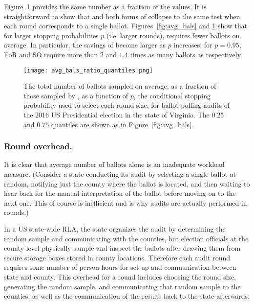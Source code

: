 Figure~\ref{fig:avg_bals_ratio} provides the same number as a fraction of the \Providence values.
It is straightforward to show that \Providence and both forms of \BRAVO collapse to the same test when each round corresponds to a single ballot. Figures~\ref{fig:avg_bals} and \ref{fig:avg_bals_ratio} show that for larger stopping probabilities $p$ (i.e. larger rounds), \Providence requires fewer ballots on average. In particular, the savings of \Providence become larger as $p$ increases; for $p=0.95$, EoR \BRAVO and SO \BRAVO require more than $2$ and $1.4$ times as many ballots as \Providence respectively. 
\begin{figure}[h!]
\texttt{[image: avg\_bals\_ratio\_quantiles.png]}
\caption{The total number of ballots sampled on average, as a fraction of those sampled by \Providence, as a function of $p$, the conditional stopping probability used to select each round size, for ballot polling audits of the 2016 US Presidential election in the state of Virginia. The $0.25$ and $0.75$ quantiles are shown as in Figure~\ref{fig:avg_bals}.}
\label{fig:avg_bals_ratio}
\end{figure}


\subsubsection{Round overhead.} 
It is clear that average number of ballots alone is an inadequate workload measure. 
(Consider a state conducting its audit by selecting a single ballot at random, 
notifying just the county where the ballot is located, and then waiting to hear back for the manual interpretation of the ballot before moving on to the next one. 
This of course is inefficient and is why audits are actually performed in rounds.)

In a US state-wide RLA, the state organizes the audit by determining the random sample and communicating with the counties, but election officials at the county level physically sample and inspect the ballots after drawing them from secure storage boxes stored in county locations. 
Therefore each audit round requires some number of person-hours for set up and communication between state and county. This overhead for a round includes choosing the round size, generating the random sample, and communicating that random sample to the counties, as well as the communication of the results back to the state afterwards. 

